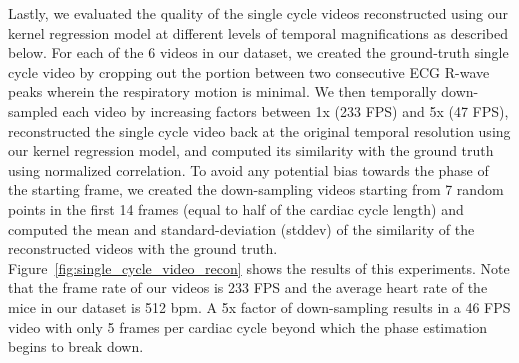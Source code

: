 \documentclass[journal]{IEEEtran}
\begin{document}
Lastly, we evaluated the quality of the single cycle videos reconstructed using our kernel regression model at different levels of temporal magnifications as described below. For each of the 6 videos in our dataset, we created the ground-truth single cycle video by cropping out the portion between two consecutive ECG R-wave peaks wherein the respiratory motion is minimal. We then temporally down-sampled each video by increasing factors between 1x (233 FPS) and 5x (47 FPS), reconstructed the single cycle video back at the original temporal resolution using our kernel regression model, and computed its similarity with the ground truth using normalized correlation. To avoid any potential bias towards the phase of the starting frame, we created the down-sampling videos starting from 7 random points in the first 14 frames (equal to half of the cardiac cycle length) and computed the mean and standard-deviation (stddev) of the similarity of the reconstructed videos with the ground truth. Figure~\ref{fig:single_cycle_video_recon} shows the results of this experiments. Note that the frame rate of our videos is 233 FPS and the average heart rate of the mice in our dataset is 512 bpm. A 5x factor of down-sampling results in a 46 FPS video with only 5 frames per cardiac cycle beyond which the phase estimation begins to break down.
\end{document}
